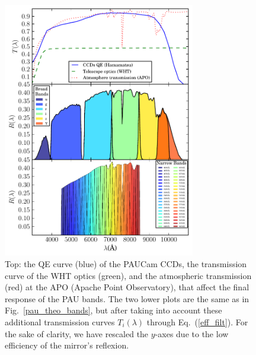 \begin{figure}
\centering
\includegraphics[width=84mm]{./plots/pau_effective_bands.pdf}
\caption{Top: the QE curve (blue) of the PAUCam CCDs, the transmission curve of the WHT optics (green), and the atmospheric transmission (red) at the APO (Apache Point Observatory), that affect the final response of the PAU bands. The two lower plots are the same as in Fig.~\ref{pau_theo_bands}, but after taking into account these additional transmission curves $T_i(\lambda)$ through Eq.~(\ref{eff_filt}). For the sake of clarity, we have rescaled the $y$-axes due to the low efficiency of the mirror's reflexion.}
\label{pau_effective_bands}
\end{figure}

